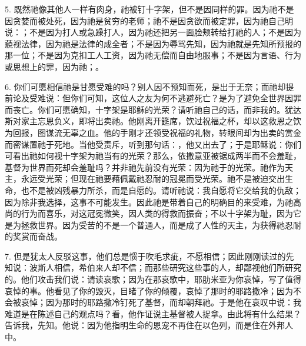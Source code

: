 5. 既然祂像其他人一样有肉身，祂被钉十字架，但不是因同样的罪。因为祂不是因贪婪而被处死，因为祂是贫穷的老师；祂不是因贪欲而被定罪，因为祂自己明说：；不是因为打人或急躁打人，因为祂还把另一面脸颊转给打祂的人；不是因为藐视法律，因为祂是法律的成全者；不是因为辱骂先知，因为祂就是先知所预报的那一位；不是因为克扣工人工资，因为祂无偿而自由地服事；不是因为言语、行为或思想上的罪，因为祂；。\par

6. 你们可愿相信祂是甘愿受难的吗？别人因不预知而死，是出于无奈；而祂却提前论及受难说：但你们可知，这位人之友为何不逃避死亡？是为了避免全世界因罪而丧亡。你们可愿确知，十字架是耶稣的光荣？请听祂自己的话，而非我的。犹达斯对家主忘恩负义，即将出卖祂。他刚离开筵席，饮过祝福之杯，却以这救恩之饮为回报，图谋流无辜之血。他的手刚才还领受祝福的礼物，转眼间却为出卖的赏金而密谋置祂于死地。当他受责斥，听到那句话：，他又出去了；于是耶稣说：你们可看出祂如何视十字架为祂当有的光荣？那么，依撒意亚被锯成两半而不会羞耻，基督为世界而死却会羞耻吗？并非祂先前没有光荣：因为祂于的光荣。祂作为天主，永远受光荣；但现在祂要藉佩戴祂忍耐的冠冕而受光荣。祂不是被迫交出生命，也不是被凶残暴力所杀，而是自愿的。请听祂说：我自愿将它交给我的仇敌；因为除非我选择，这事不可能发生。因此祂是带着自己的明确目的来受难，为祂高尚的行为而喜乐，对这冠冕微笑，因人类的得救而振奋；不以十字架为耻，因为它是为拯救世界。因为受苦的不是一个普通人，而是成了人性的天主，为获得祂忍耐的奖赏而奋战。\par

7. 但是犹太人反驳这事，他们总是惯于吹毛求疵，不愿相信；因此刚刚读过的先知说：波斯人相信，希伯来人却不信；而那些研究这些事的人，却鄙视他们所研究的。他们攻击我们说：请读哀歌；因为在那哀歌中，耶肋米亚为你哀悼，写了值得哀悼的事。他看见了你的毁灭，目睹了你的倾覆，哀悼了那时的耶路撒冷；因为不会被哀悼；因为那时的耶路撒冷钉死了基督，而却朝拜祂。于是他在哀叹中说：我难道是在陈述自己的观点吗？看，他作证说主基督被人捉拿。由此将有什么结果？告诉我，先知。他说：因为他指明生命的恩宠不再住在以色列，而是住在外邦人中。\par

